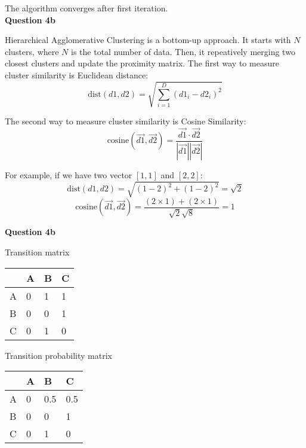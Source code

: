 \documentclass[11pt,a4paper]{report}
\begin{document}
\begin{multicols*}{2}
\noindent The algorithm converges after first iteration. \\

\noindent \textbf{Question 4b}

\noindent Hierarchical Agglomerative Clustering is a bottom-up approach. It starts with $N$ clusters, where $N$ is the total number of data. Then, it repeatively merging two closest clusters and update the proximity matrix. The first way to measure cluster similarity is Euclidean distance:
$$\text{dist}(d1,d2)=\sqrt{\sum_{i=1}^D (d1_{i} - d2_{i})^2}$$

\noindent The second way to measure cluster similarity is Cosine Similarity:
$$\text{cosine}(\vec{d1},\vec{d2}) = \frac{\vec{d1} \cdot \vec{d2}}{|\vec{d1}||\vec{d2}|}$$

\noindent For example, if we have two vector $[1,1]$ and $[2,2]$:
$$\text{dist}(d1,d2)=\sqrt{(1-2)^2 + (1-2)^2} = \sqrt{2}$$
$$\text{cosine}(\vec{d1},\vec{d2}) = \frac{(2\times 1) + (2\times 1)}{\sqrt{2}\sqrt{8}} = 1$$

\noindent \textbf{Question 4b}

\begin{center}
\end{center}

\noindent Transition matrix
\begin{center}
\begin{tabular}{ |l|l|l|l| }
    \hline
      & A  & B  & C \\
    \hline
    A & 0  & 1  & 1  \\
    B & 0  & 0  & 1  \\
    C & 0  & 1  & 0  \\
    \hline
\end{tabular}
\end{center}

\noindent Transition probability matrix
\begin{center}
\begin{tabular}{ |l|l|l|l| }
    \hline
      & A    & B  & C \\
    \hline
    A & 0    & 0.5 & 0.5  \\
    B & 0    & 0   & 1    \\
    C & 0    & 1   & 0    \\
    \hline
\end{tabular}
\end{center}


\end{multicols*}
\end{document}
